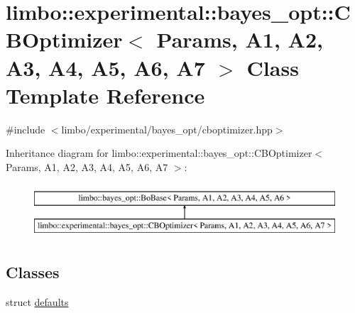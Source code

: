 \hypertarget{classlimbo_1_1experimental_1_1bayes__opt_1_1_c_b_optimizer}{}\section{limbo\+:\+:experimental\+:\+:bayes\+\_\+opt\+:\+:C\+B\+Optimizer$<$ Params, A1, A2, A3, A4, A5, A6, A7 $>$ Class Template Reference}
\label{classlimbo_1_1experimental_1_1bayes__opt_1_1_c_b_optimizer}


{\ttfamily \#include $<$limbo/experimental/bayes\+\_\+opt/cboptimizer.\+hpp$>$}

Inheritance diagram for limbo\+:\+:experimental\+:\+:bayes\+\_\+opt\+:\+:C\+B\+Optimizer$<$ Params, A1, A2, A3, A4, A5, A6, A7 $>$\+:\begin{figure}[H]
\begin{center}
\leavevmode
\includegraphics[height=2.000000cm]{classlimbo_1_1experimental_1_1bayes__opt_1_1_c_b_optimizer}
\end{center}
\end{figure}
\subsection*{Classes}
\begin{DoxyCompactItemize}
\item 
struct \hyperlink{structlimbo_1_1experimental_1_1bayes__opt_1_1_c_b_optimizer_1_1defaults}{defaults}
\end{DoxyCompactItemize}
